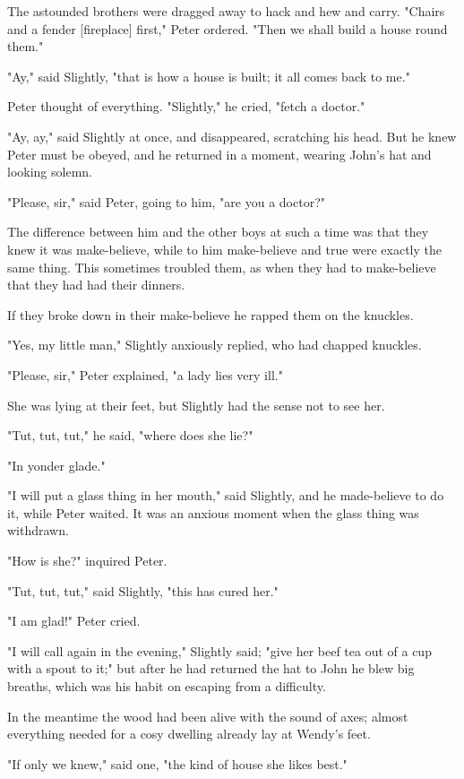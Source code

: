 The astounded brothers were dragged away to hack and hew and carry.
"Chairs and a fender [fireplace] first," Peter ordered. "Then we shall
build a house round them."


"Ay," said Slightly, "that is how a house is built; it all comes back to
me."


Peter thought of everything. "Slightly," he cried, "fetch a doctor."


"Ay, ay," said Slightly at once, and disappeared, scratching his head. But
he knew Peter must be obeyed, and he returned in a moment, wearing John's
hat and looking solemn.


"Please, sir," said Peter, going to him, "are you a doctor?"


The difference between him and the other boys at such a time was that they
knew it was make-believe, while to him make-believe and true were exactly
the same thing. This sometimes troubled them, as when they had to
make-believe that they had had their dinners.


If they broke down in their make-believe he rapped them on the knuckles.


"Yes, my little man," Slightly anxiously replied, who had chapped
knuckles.


"Please, sir," Peter explained, "a lady lies very ill."


She was lying at their feet, but Slightly had the sense not to see her.


"Tut, tut, tut," he said, "where does she lie?"


"In yonder glade."


"I will put a glass thing in her mouth," said Slightly, and he
made-believe to do it, while Peter waited. It was an anxious moment when
the glass thing was withdrawn.


"How is she?" inquired Peter.


"Tut, tut, tut," said Slightly, "this has cured her."


"I am glad!" Peter cried.


"I will call again in the evening," Slightly said; "give her beef tea out
of a cup with a spout to it;" but after he had returned the hat to John he
blew big breaths, which was his habit on escaping from a difficulty.


In the meantime the wood had been alive with the sound of axes; almost
everything needed for a cosy dwelling already lay at Wendy's feet.


"If only we knew," said one, "the kind of house she likes best."



